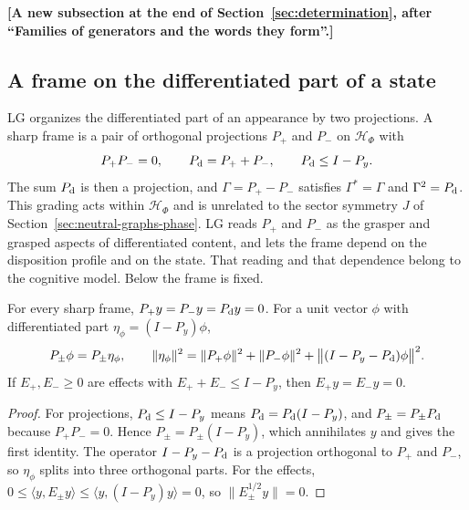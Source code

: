 \par\medskip\noindent\textbf{[A new subsection at the end of Section~\ref{sec:determination}, after ``Families of generators and the words they form''.]}\par\smallskip

\subsection{A frame on the differentiated part of a state}
\label{subsec:duality-frame}

LG organizes the differentiated part of an appearance by two projections. A sharp frame is a pair of orthogonal projections $P_+$ and $P_-$ on $\mathcal H_\Phi$ with
\begin{equation}
 P_+P_-=0,\qquad P_{\rm d}=P_++P_-,\qquad P_{\rm d}\leq I-P_y .
 \label{eq:duality-frame}
\end{equation}
The sum $P_{\rm d}$ is then a projection, and $\Gamma=P_+-P_-$ satisfies $\Gamma^*=\Gamma$ and $\Gamma^2=P_{\rm d}$. This grading acts within $\mathcal H_\Phi$ and is unrelated to the sector symmetry $J$ of Section~\ref{sec:neutral-graphs-phase}. LG reads $P_+$ and $P_-$ as the grasper and grasped aspects of differentiated content, and lets the frame depend on the disposition profile and on the state. That reading and that dependence belong to the cognitive model. Below the frame is fixed.

\begin{proposition}
\label{prop:duality-frame-ground}
For every sharp frame, $P_+y=P_-y=P_{\rm d}y=0$. For a unit vector $\phi$ with differentiated part $\eta_\phi=(I-P_y)\phi$,
\begin{equation}
 P_\pm\phi=P_\pm\eta_\phi,\qquad
 \|\eta_\phi\|^2=\|P_+\phi\|^2+\|P_-\phi\|^2+\bigl\|(I-P_y-P_{\rm d})\phi\bigr\|^2 .
 \label{eq:duality-frame-norms}
\end{equation}
If $E_+,E_-\geq0$ are effects with $E_++E_-\leq I-P_y$, then $E_+y=E_-y=0$.
\end{proposition}
\begin{proof}
For projections, $P_{\rm d}\leq I-P_y$ means $P_{\rm d}=P_{\rm d}(I-P_y)$, and $P_\pm=P_\pm P_{\rm d}$ because $P_+P_-=0$. Hence $P_\pm=P_\pm(I-P_y)$, which annihilates $y$ and gives the first identity. The operator $I-P_y-P_{\rm d}$ is a projection orthogonal to $P_+$ and $P_-$, so $\eta_\phi$ splits into three orthogonal parts. For the effects, $0\leq\langle y,E_\pm y\rangle\leq\langle y,(I-P_y)y\rangle=0$, so $\|E_\pm^{1/2}y\|=0$.
\end{proof}

